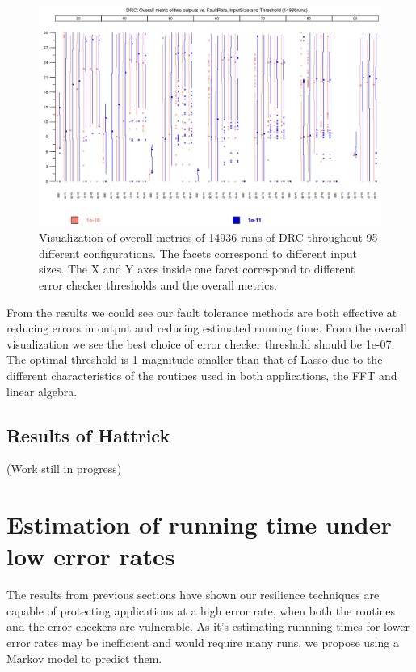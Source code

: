 \documentclass{article}
\begin{document}
\begin{figure}[h!]
\begin{center}
\includegraphics[width=16cm]{Overall_Metric_DRC.png}
\end{center}
\caption{Visualization of overall metrics of 14936 runs of DRC throughout 95 different configurations. The facets correspond to different input sizes. The X and Y axes inside one facet correspond to different error checker thresholds and the overall metrics.}
\end{figure}

From the results we could see our fault tolerance methods are both effective at reducing errors in output and reducing estimated running time. From the overall visualization we see the best choice of error checker threshold should be 1e-07. The optimal threshold is 1 magnitude smaller than that of Lasso due to the different characteristics of the routines used in both applications, the FFT and linear algebra.

\subsection{Results of Hattrick}

(Work still in progress)

\section{Estimation of running time under low error rates}

The results from previous sections have shown our resilience techniques are capable of protecting applications at a high error rate, when both the routines and the error checkers are vulnerable. As it's estimating runnning times for lower error rates may be inefficient and would require many runs, we propose using a Markov model to predict them.
\end{document}
